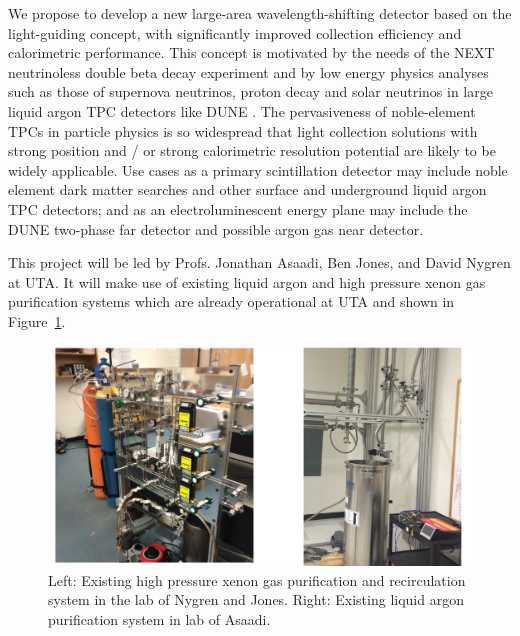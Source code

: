 We propose to develop a new large-area wavelength-shifting detector based on the light-guiding concept, with significantly improved collection efficiency and calorimetric performance.  This concept is motivated by the needs of the NEXT neutrinoless double beta decay experiment \cite{Mart} and by low energy physics analyses such as those of supernova neutrinos, proton decay and solar neutrinos in large liquid argon TPC detectors like DUNE \cite{Ankowski:2016lab,Kudryavtsev:2016ybl}. The pervasiveness of noble-element TPCs in particle physics is so widespread that light collection solutions with strong position and / or strong calorimetric resolution potential are likely to be widely applicable.  Use cases as a primary scintillation detector may include noble element dark matter searches and other surface and underground liquid argon TPC detectors; and as an electroluminescent energy plane may include the DUNE two-phase far detector and possible argon gas near detector.


This project will be led by Profs. Jonathan Asaadi, Ben Jones, and David Nygren at UTA.  It will make use of existing liquid argon and high pressure xenon gas purification systems which are already operational at UTA and shown in Figure~\ref{fig:ExistingGasSystems}.  


\begin{figure}[t]
\begin{centering}
\includegraphics[width=0.80\columnwidth]{./images/PhotosOfLabs.pdf}
\par\end{centering}

\caption{Left: Existing high pressure xenon gas purification and recirculation system in the lab of Nygren and Jones.  Right: Existing liquid argon purification system in lab of Asaadi. \label{fig:ExistingGasSystems}}
\end{figure}

